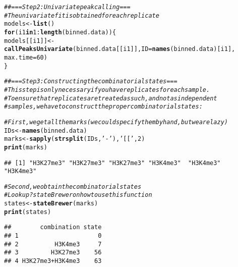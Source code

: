 \documentclass[11pt]{article}\usepackage[]{graphicx}\usepackage[]{color}
\makeatletter
\newcommand{\hlnum}[1]{\textcolor[rgb]{0.686,0.059,0.569}{#1}}%
\newcommand{\hlstr}[1]{\textcolor[rgb]{0.192,0.494,0.8}{#1}}%
\newcommand{\hlcom}[1]{\textcolor[rgb]{0.678,0.584,0.686}{\textit{#1}}}%
\newcommand{\hlopt}[1]{\textcolor[rgb]{0,0,0}{#1}}%
\newcommand{\hlstd}[1]{\textcolor[rgb]{0.345,0.345,0.345}{#1}}%
\newcommand{\hlkwa}[1]{\textcolor[rgb]{0.161,0.373,0.58}{\textbf{#1}}}%
\newcommand{\hlkwb}[1]{\textcolor[rgb]{0.69,0.353,0.396}{#1}}%
\newcommand{\hlkwc}[1]{\textcolor[rgb]{0.333,0.667,0.333}{#1}}%
\newcommand{\hlkwd}[1]{\textcolor[rgb]{0.737,0.353,0.396}{\textbf{#1}}}%
\newenvironment{kframe}{%
 \def\at@end@of@kframe{}%
 \ifinner\ifhmode%
  \def\at@end@of@kframe{\end{minipage}}%
  \begin{minipage}{\columnwidth}%
 \fi\fi%
 \def\FrameCommand##1{\hskip\@totalleftmargin \hskip-\fboxsep
 \colorbox{shadecolor}{##1}\hskip-\fboxsep
     \hskip-\linewidth \hskip-\@totalleftmargin \hskip\columnwidth}%
 \MakeFramed {\advance\hsize-\width
   \@totalleftmargin\z@ \linewidth\hsize
   \@setminipage}}%
 {\par\unskip\endMakeFramed%
 \at@end@of@kframe}
\newenvironment{knitrout}{}{} %
\makeatother
\begin{document}
\begin{scriptsize}
\begin{knitrout}
\color{fgcolor}\begin{kframe}
\begin{alltt}
\hlcom{## === Step 2: Univariate peak calling ===}
\hlcom{# The univariate fit is obtained for each replicate}
\hlstd{models} \hlkwb{<-} \hlkwd{list}\hlstd{()}
\hlkwa{for} \hlstd{(i1} \hlkwa{in} \hlnum{1}\hlopt{:}\hlkwd{length}\hlstd{(binned.data)) \{}
  \hlstd{models[[i1]]} \hlkwb{<-} \hlkwd{callPeaksUnivariate}\hlstd{(binned.data[[i1]],} \hlkwc{ID}\hlstd{=}\hlkwd{names}\hlstd{(binned.data)[i1],}
                                      \hlkwc{max.time}\hlstd{=}\hlnum{60}\hlstd{)}
\hlstd{\}}
\end{alltt}
\end{kframe}
\end{knitrout}

\begin{knitrout}
\color{fgcolor}\begin{kframe}
\begin{alltt}
\hlcom{## === Step 3: Constructing the combinatorial states ===}
\hlcom{# This step is only necessary if you have replicates for each sample.}
\hlcom{# To ensure that replicates are treated as such, and not as independent}
\hlcom{# samples, we have to construct the proper combinatorial states:}

\hlcom{# First, we get all the marks (we could specify them by hand, but we are lazy)}
\hlstd{IDs} \hlkwb{<-} \hlkwd{names}\hlstd{(binned.data)}
\hlstd{marks} \hlkwb{<-} \hlkwd{sapply}\hlstd{(}\hlkwd{strsplit}\hlstd{(IDs,}\hlstr{'-'}\hlstd{),}\hlstr{'[['}\hlstd{,}\hlnum{2}\hlstd{)}
\hlkwd{print}\hlstd{(marks)}
\end{alltt}
\begin{verbatim}
## [1] "H3K27me3" "H3K27me3" "H3K27me3" "H3K4me3"  "H3K4me3"  "H3K4me3"
\end{verbatim}
\begin{alltt}
\hlcom{# Second, we obtain the combinatorial states}
\hlcom{# Look up ?stateBrewer on how to use this function}
\hlstd{states} \hlkwb{<-} \hlkwd{stateBrewer}\hlstd{(marks)}
\hlkwd{print}\hlstd{(states)}
\end{alltt}
\begin{verbatim}
##        combination state
## 1                      0
## 2          H3K4me3     7
## 3         H3K27me3    56
## 4 H3K27me3+H3K4me3    63
\end{verbatim}
\end{kframe}
\end{knitrout}


\end{scriptsize}
\end{document}

